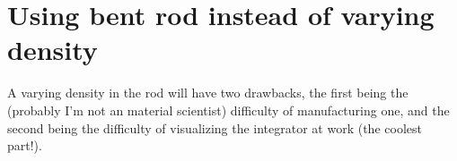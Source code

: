 \documentclass[letterpaper, 12pt]{article}
\begin{document}
\section{Using bent rod instead of varying density}
A varying density in the rod will have two drawbacks, the first being the (probably I'm not an material scientist) difficulty of manufacturing one, and the second being the difficulty of visualizing the integrator at work (the coolest part!).
\begin{center}
\end{center}
\end{document}
